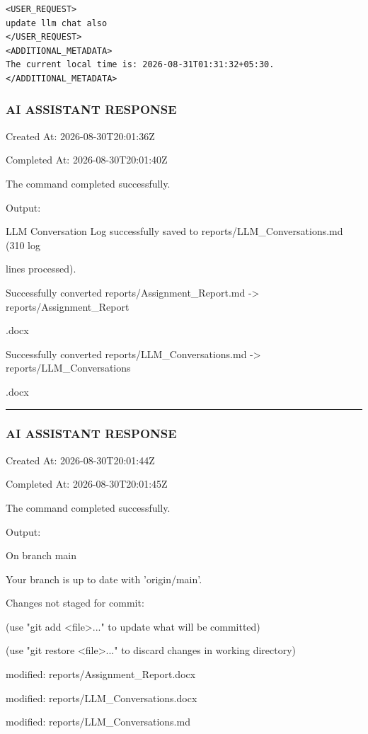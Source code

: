 \documentclass[11pt,a4paper]{article}
\begin{document}
{\begin{lstlisting}[language=text]
<USER_REQUEST>
update llm chat also 
</USER_REQUEST>
<ADDITIONAL_METADATA>
The current local time is: 2026-08-31T01:31:32+05:30.
</ADDITIONAL_METADATA>
\end{lstlisting}


\subsubsection{AI ASSISTANT RESPONSE}

Created At: 2026-08-30T20:01:36Z

Completed At: 2026-08-30T20:01:40Z


The command completed successfully.

Output:

LLM Conversation Log successfully saved to reports/LLM\_Conversations.md (310 log

lines processed).

Successfully converted reports/Assignment\_Report.md -> reports/Assignment\_Report

.docx

Successfully converted reports/LLM\_Conversations.md -> reports/LLM\_Conversations

.docx


\hrule

\subsubsection{AI ASSISTANT RESPONSE}

Created At: 2026-08-30T20:01:44Z

Completed At: 2026-08-30T20:01:45Z


The command completed successfully.

Output:

On branch main

Your branch is up to date with 'origin/main'.


Changes not staged for commit:

(use "git add <file>..." to update what will be committed)

(use "git restore <file>..." to discard changes in working directory)

modified:   reports/Assignment\_Report.docx

modified:   reports/LLM\_Conversations.docx

modified:   reports/LLM\_Conversations.md


}
\end{document}
